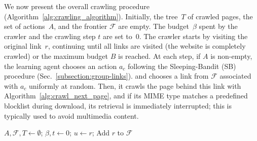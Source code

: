 We now present the overall crawling procedure (Algorithm~\ref{alg:crawling_algorithm}). Initially, the tree~$T$ of crawled pages, the set of
actions~$A$, and the frontier $\mathcal{F}$ are empty. The budget~$\beta$
spent by the crawler and the crawling step $t$ are set to~$0$. The crawler starts by visiting the original link~$r$, continuing until all links are visited (the website is completely
crawled) or the maximum budget $B$ is reached. At each step, if $A$ is non-empty,
the learning agent chooses an action $a_c$ following the Sleeping-Bandit (SB)
procedure (Sec.~\ref{subsection:group-links}). and chooses a link from $\mathcal{F}$ associated with $a_c$ uniformly at random. Then, it crawls the page behind this link
with Algorithm~\ref{alg:crawl_next_page}, and if its MIME type matches a predefined blocklist during download, its retrieval is
immediately interrupted; this is typically used to avoid 
multimedia content.

\begin{algorithm}[t!]
	\caption{Efficient target retrieval}\label{alg:crawling_algorithm}
	$A, \mathcal{F}, T \gets \emptyset$; $\beta, t \gets 0$; $u \gets r$; Add $r$ to $\mathcal{F}$\;
\end{algorithm}

